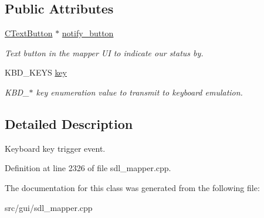 \subsection*{Public Attributes}
\begin{DoxyCompactItemize}
\item 
\hypertarget{classCKeyEvent_a93407353bb472fc93fa7962f1c2e7933}{\hyperlink{classCTextButton}{C\-Text\-Button} $\ast$ \hyperlink{classCKeyEvent_a93407353bb472fc93fa7962f1c2e7933}{notify\-\_\-button}}\label{classCKeyEvent_a93407353bb472fc93fa7962f1c2e7933}

\begin{DoxyCompactList}\small\item\em Text button in the mapper U\-I to indicate our status by. \end{DoxyCompactList}\item 
\hypertarget{classCKeyEvent_aa5d774b3b526c036d79dbf87ba437afd}{K\-B\-D\-\_\-\-K\-E\-Y\-S \hyperlink{classCKeyEvent_aa5d774b3b526c036d79dbf87ba437afd}{key}}\label{classCKeyEvent_aa5d774b3b526c036d79dbf87ba437afd}

\begin{DoxyCompactList}\small\item\em K\-B\-D\-\_\-$\ast$ key enumeration value to transmit to keyboard emulation. \end{DoxyCompactList}\end{DoxyCompactItemize}


\subsection{Detailed Description}
Keyboard key trigger event. 

Definition at line 2326 of file sdl\-\_\-mapper.\-cpp.



The documentation for this class was generated from the following file\-:\begin{DoxyCompactItemize}
\item 
src/gui/sdl\-\_\-mapper.\-cpp\end{DoxyCompactItemize}
